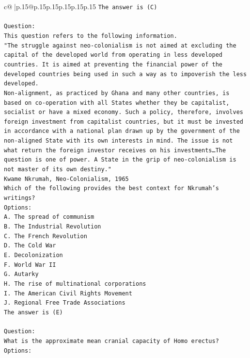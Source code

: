 \documentclass{article}
\begin{document}
{\begin{supertabular}{c@{$\;$}|p{.15\linewidth}@{}p{.15\linewidth}p{.15\linewidth}p{.15\linewidth}p{.15\linewidth}p{.15\linewidth}}
{{{\texttt{The answer is (C)} \\
\\ 
\texttt{Question:} \\
\texttt{This question refers to the following information.} \\
\texttt{"The struggle against neo{-}colonialism is not aimed at excluding the capital of the developed world from operating in less developed countries. It is aimed at preventing the financial power of the developed countries being used in such a way as to impoverish the less developed.} \\
\texttt{Non{-}alignment, as practiced by Ghana and many other countries, is based on co{-}operation with all States whether they be capitalist, socialist or have a mixed economy. Such a policy, therefore, involves foreign investment from capitalist countries, but it must be invested in accordance with a national plan drawn up by the government of the non{-}aligned State with its own interests in mind. The issue is not what return the foreign investor receives on his investments…The question is one of power. A State in the grip of neo{-}colonialism is not master of its own destiny."} \\
\texttt{Kwame Nkrumah, Neo{-}Colonialism, 1965} \\
\texttt{Which of the following provides the best context for Nkrumah's writings?} \\
\texttt{Options:} \\
\texttt{A. The spread of communism} \\
\texttt{B. The Industrial Revolution} \\
\texttt{C. The French Revolution} \\
\texttt{D. The Cold War} \\
\texttt{E. Decolonization} \\
\texttt{F. World War II} \\
\texttt{G. Autarky} \\
\texttt{H. The rise of multinational corporations} \\
\texttt{I. The American Civil Rights Movement} \\
\texttt{J. Regional Free Trade Associations} \\
\texttt{The answer is (E)} \\
\\ 
\texttt{Question:} \\
\texttt{What is the approximate mean cranial capacity of Homo erectus?} \\
\texttt{Options:} \\
}}}
\end{supertabular}}
\end{document}
